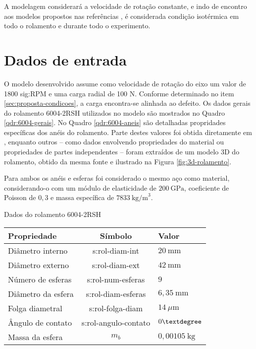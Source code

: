 \documentclass[12pt,oneside,english,brazil,lmodern,siglas,simbolos,cite=num]{ucsmonograph}
\begin{document}
	A modelagem considerará a velocidade de rotação constante, e indo de encontro aos modelos propostos nas referências \cite{mcfadden:1984,sassi:2007,patil:2010,cong:2013,tandon:1997}, é considerada condição isotérmica em todo o rolamento e durante todo o experimento.
	
	\section{Dados de entrada} \label{sec:dados-entrada}
	O modelo desenvolvido assume como velocidade de rotação do eixo um valor de 1800 \gls{sig:RPM} e uma carga radial de 100 N.
	Conforme determinado no item \ref{sec:proposta-condicoes}, a carga encontra-se alinhada ao defeito.
	Os dados gerais do rolamento 6004-2RSH utilizados no modelo são mostrados no Quadro \ref{qdr:6004-gerais}.
	No Quadro \ref{qdr:6004-aneis} são detalhadas propridades específicas dos anéis do rolamento.
	Parte destes valores foi obtida diretamente em \cite{skf6004}, enquanto outros -- como dados envolvendo propriedades do material ou propriedades de partes independentes -- foram extraídos de um modelo 3D do rolamento, obtido da mesma fonte e ilustrado na Figura \ref{fig:3d-rolamento}.
	
	Para ambos os anéis e esferas foi considerado o mesmo aço como material, considerando-o com um módulo de elasticidade de $200\ \text{GPa}$, coeficiente de Poisson de $ 0,3 $ e massa específica de $ 7833\ \text{kg/m}^3$.
	
	\begin{quadro}[t]
	\caption{Dados do rolamento 6004-2RSH}
	\def\arraystretch{1.2}
	\begin{tabular}{l|c|l}
	\hline
	\textbf{Propriedade} & \textbf{Símbolo} & \textbf{Valor} \\\hline\hline
	Diâmetro interno & \gls{s:rol-diam-int} & $20\ \text{mm}$ \\\hline
	Diâmetro externo & \gls{s:rol-diam-ext} & $42\ \text{mm}$ \\\hline
	Número de esferas & \gls{s:rol-num-esferas} & $ 9 $\\\hline
	Diâmetro da esfera & \gls{s:rol-diam-esferas} & $6,35\ \text{mm}$ \\\hline
	Folga diametral & \gls{s:rol-folga-diam} & $ 14\ \mu\text{m} $ \\\hline
	Ângulo de contato & \gls{s:rol-angulo-contato} & $ 0\textdegree $ \\\hline
	Massa da esfera & $ m_b $ & $ 0,00105\ \text{kg} $ \\\hline
	\end{tabular}
	\label{qdr:6004-gerais}
	\end{quadro}
\end{document}
